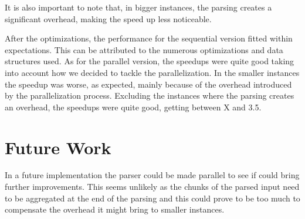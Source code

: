 \documentclass[a4paper]{article}
\begin{document}
It is also important to note that, in bigger instances, the parsing creates a
significant overhead, making the speed up less noticeable.

After the optimizations, the performance for the sequential version fitted
within expectations. This can be attributed to the numerous optimizations and
data structures used.  As for the parallel version, the speedups were quite good
taking into account how we decided to tackle the parallelization. In the smaller
instances the speedup was worse, as expected, mainly because of the overhead
introduced by the parallelization process. Excluding the instances where the
parsing creates an overhead, the speedups were quite good, getting between X
and 3.5.

\section{Future Work}
In a future implementation the parser could be made parallel to see if could
bring further improvements. This seems unlikely as the chunks of the parsed
input need to be aggregated at the end of the parsing and this could prove to be
too much to compensate the overhead it might bring to smaller instances.


\end{document}
